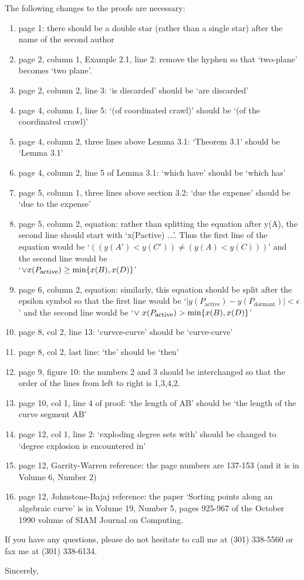 \begin{letter}
The following changes to the proofs are necessary:
\begin{enumerate}
\item
	page 1: there should be a double star (rather than a single star)
	after the name of the second author
\item
	page 2, column 1, Example 2.1, line 2: remove the hyphen
	so that `two-plane' becomes `two plane'.
\item
	page 2, column 2, line 3: `is discarded' should be `are discarded'
\item
	page 4, column 1, line 5: `(of coordinated crawl)' should be
	`(of the coordinated crawl)'
\item
	page 4, column 2, three lines above Lemma 3.1: `Theorem 3.1'
	should be `Lemma 3.1'
\item
	page 4, column 2, line 5 of Lemma 3.1: `which have' should be
	`which has'
\item
	page 5, column 1, three lines above section 3.2: `due the expense'
	should be `due to the expense'
\item
	page 5, column 2, equation: rather than splitting the equation
	after y(A), the second line should start with `x(Pactive) ...'.
	Thus the first line of the equation would be
	`$((y(A') < y(C')) \neq (y(A) < y(C)))$'
	and the second line would be \\
	`$\vee x(P_{\mbox{\footnotesize{active}}}) 
	\geq \mbox{min} \{x(B),x(D)\}$'
\item
	page 6, column 2, equation: similarly, this equation should be
	split after the epsilon symbol so that the first line would be 
	`$|y(P_{\mbox{active}}) - y(P_{\mbox{dormant}})| < \epsilon$'
	and the second line would be
	`$\vee \ x(P_{\mbox{\footnotesize{active}}})>\mbox{min} \{x(B),x(D)\}$'
\item
	page 8, col 2, line 13: `curvce-curve' should be `curve-curve'
\item
	page 8, col 2, last line: `the' should be `then'
\item
	page 9, figure 10: the numbers 2 and 3 should be interchanged
	so that the order of the lines from left to right is 1,3,4,2.
\item
	page 10, col 1, line 4 of proof: `the length of AB' should be 
	`the length of the curve segment AB'
\item
	page 12, col 1, line 2: `exploding degree sets with' should
	be changed to `degree explosion is encountered in'
\item
	page 12, Garrity-Warren reference: the page numbers are 137-153
	(and it is in Volume 6, Number 2)
\item
	page 12, Johnstone-Bajaj reference: the paper `Sorting points along
	an algebraic curve' is in Volume 19, Number 5, pages 925-967
	of the October 1990 volume of SIAM Journal on Computing.
\end{enumerate}


If you have any questions, please do not hesitate to call me at
(301) 338-5560 or fax me at (301) 338-6134.

\closing{Sincerely, }
\end{letter}

